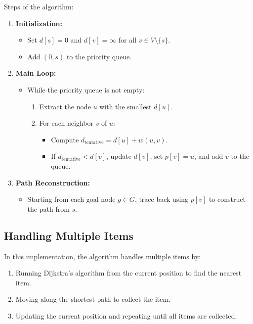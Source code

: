 \documentclass[12pt]{article}
\begin{document}
\noindent Steps of the algorithm:
\begin{enumerate}
    \item \textbf{Initialization:}
    \begin{itemize}
        \item Set \( d[s] = 0 \) and \( d[v] = \infty \) for all \( v \in V \setminus \{s\} \).
        \item Add \( (0, s) \) to the priority queue.
    \end{itemize}
    \item \textbf{Main Loop:}
    \begin{itemize}
        \item While the priority queue is not empty:
        \begin{enumerate}
            \item Extract the node \( u \) with the smallest \( d[u] \).
            \item For each neighbor \( v \) of \( u \):
            \begin{itemize}
                \item Compute \( d_{\text{tentative}} = d[u] + w(u, v) \).
                \item If \( d_{\text{tentative}} < d[v] \), update \( d[v] \), set \( p[v] = u \), and add \( v \) to the queue.
            \end{itemize}
        \end{enumerate}
    \end{itemize}
    \item \textbf{Path Reconstruction:}
    \begin{itemize}
        \item Starting from each goal node \( g \in G \), trace back using \( p[v] \) to construct the path from \( s \).
    \end{itemize}
\end{enumerate}

\subsection{Handling Multiple Items}
In this implementation, the algorithm handles multiple items by:
\begin{enumerate}
    \item Running Dijkstra's algorithm from the current position to find the nearest item.
    \item Moving along the shortest path to collect the item.
    \item Updating the current position and repeating until all items are collected.
\end{enumerate}
\end{document}

